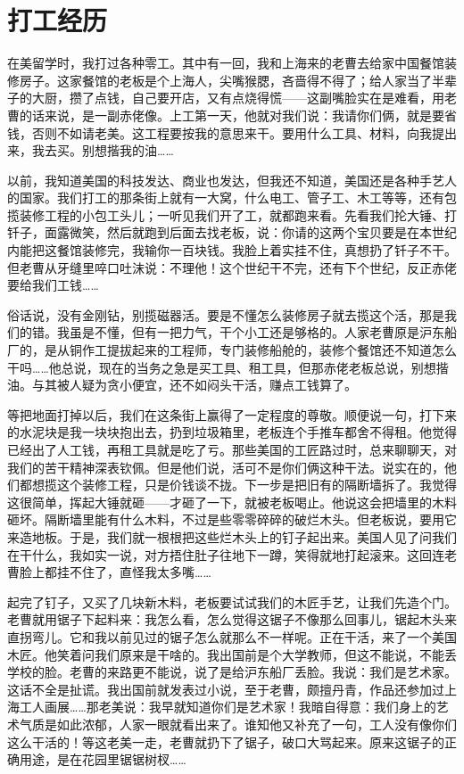 \chapter{打工经历}

在美留学时，我打过各种零工。其中有一回，我和上海来的老曹去给家中国餐馆装修房子。这家餐馆的老板是个上海人，尖嘴猴腮，吝啬得不得了；给人家当了半辈子的大厨，攒了点钱，自己要开店，又有点烧得慌——这副嘴脸实在是难看，用老曹的话来说，是一副赤佬像。上工第一天，他就对我们说：我请你们俩，就是要省钱，否则不如请老美。这工程要按我的意思来干。要用什么工具、材料，向我提出来，我去买。别想揩我的油…… 

以前，我知道美国的科技发达、商业也发达，但我还不知道，美国还是各种手艺人的国家。我们打工的那条街上就有一大窝，什么电工、管子工、木工等等，还有包揽装修工程的小包工头儿；一听见我们开了工，就都跑来看。先看我们抡大锤、打钎子，面露微笑，然后就跑到后面去找老板，说：你请的这两个宝贝要是在本世纪内能把这餐馆装修完，我输你一百块钱。我脸上着实挂不住，真想扔了钎子不干。但老曹从牙缝里啐口吐沫说：不理他！这个世纪干不完，还有下个世纪，反正赤佬要给我们工钱…… 

俗话说，没有金刚钻，别揽磁器活。要是不懂怎么装修房子就去揽这个活，那是我们的错。我虽是不懂，但有一把力气，干个小工还是够格的。人家老曹原是沪东船厂的，是从铜作工提拔起来的工程师，专门装修船舱的，装修个餐馆还不知道怎么干吗……他总说，现在的当务之急是买工具、租工具，但那赤佬老板总说，别想揩油。与其被人疑为贪小便宜，还不如闷头干活，赚点工钱算了。 

等把地面打掉以后，我们在这条街上赢得了一定程度的尊敬。顺便说一句，打下来的水泥块是我一块块抱出去，扔到垃圾箱里，老板连个手推车都舍不得租。他觉得已经出了人工钱，再租工具就是吃了亏。那些美国的工匠路过时，总来聊聊天，对我们的苦干精神深表钦佩。但是他们说，活可不是你们俩这种干法。说实在的，他们都想揽这个装修工程，只是价钱谈不拢。下一步是把旧有的隔断墙拆了。我觉得这很简单，挥起大锤就砸——才砸了一下，就被老板喝止。他说这会把墙里的木料砸坏。隔断墙里能有什么木料，不过是些零零碎碎的破烂木头。但老板说，要用它来造地板。于是，我们就一根根把这些烂木头上的钉子起出来。美国人见了问我们在干什么，我如实一说，对方捂住肚子往地下一蹲，笑得就地打起滚来。这回连老曹脸上都挂不住了，直怪我太多嘴…… 

起完了钉子，又买了几块新木料，老板要试试我们的木匠手艺，让我们先造个门。老曹就用锯子下起料来：我怎么看，怎么觉得这锯子不像那么回事儿，锯起木头来直拐弯儿。它和我以前见过的锯子怎么就那么不一样呢。正在干活，来了一个美国木匠。他笑着问我们原来是干啥的。我出国前是个大学教师，但这不能说，不能丢学校的脸。老曹的来路更不能说，说了是给沪东船厂丢脸。我说：我们是艺术家。这话不全是扯谎。我出国前就发表过小说，至于老曹，颇擅丹青，作品还参加过上海工人画展……那老美说：我早就知道你们是艺术家！我暗自得意：我们身上的艺术气质是如此浓郁，人家一眼就看出来了。谁知他又补充了一句，工人没有像你们这么干活的！等这老美一走，老曹就扔下了锯子，破口大骂起来。原来这锯子的正确用途，是在花园里锯锯树杈…… 


